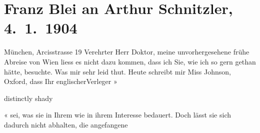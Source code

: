 

         
         \renewcommand{\erwaehntePersonen}{Personen: Alfred Bates, Franz Blei, William Heinemann, Fanny Johnson}
         \renewcommand{\erwaehnteInstitutionen}{Institutionen: William Heinemann Ltd}
         \renewcommand{\erwaehnteOrte}{Orte: Arcisstraße, England, München, Oxford, Wien}
         \renewcommand{\erwaehnteWerke}{Werke: Der grüne Kakadu. Groteske in einem Akt}
               \section[Franz Blei an Arthur Schnitzler, 4. 1. 1904]{ Franz Blei an Arthur Schnitzler, 4. 1. 1904}\nopagebreak{}\rehead{ }\begin{ledgroupsized}[t]{13cm}\normalsize\beginnumbering{} \toendnotes[C]{\smallbreak\pagebreak[2]} 
\toendnotes[C]{\smallbreak}\pstart
           \raggedleft{}{\pb}München, Arcisstrasse 19\pend
           \pstart{}Verehrter Herr Doktor,\pend\pstart
           meine unvorhergesehene frühe Abreise von Wien
               liess es nicht dazu kommen, dass ich Sie, wie ich so gern gethan hätte, besuchte. Was
               mir sehr leid thut.\pend
           \pstart
           Heute schreibt mir Miss Johnson, Oxford, dass Ihr englischerVerleger »\begin{otherlanguage}{english}distinctly shady\end{otherlanguage}« sei, was sie in Ihrem wie in ihrem
               Interesse bedauert. Doch lässt sie sich dadurch nicht abhalten, die angefangene

\end{ledgroupsized}
